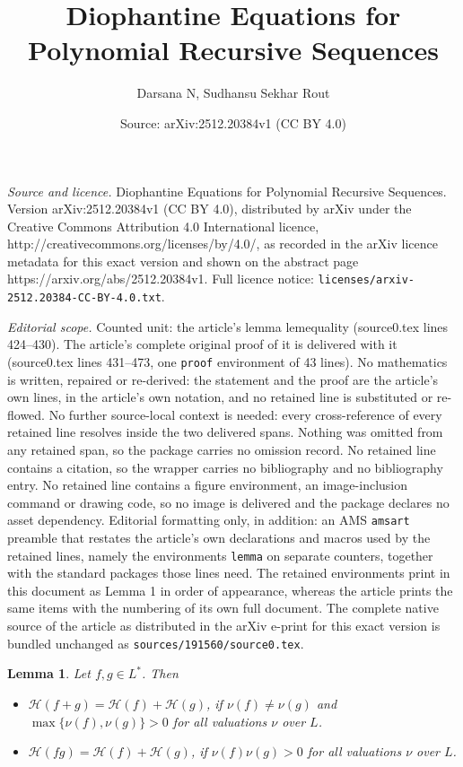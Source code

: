 \documentclass[10pt,a4paper]{amsart}
\title{Diophantine Equations for Polynomial Recursive Sequences}
\author{Darsana N, Sudhansu Sekhar Rout}
\date{Source: arXiv:2512.20384v1 (CC BY 4.0)}
\newtheorem{lemma}{Lemma}
\begin{document}
\maketitle

\noindent\emph{Source and licence.} Diophantine Equations for Polynomial Recursive Sequences. Version arXiv:2512.20384v1 (CC BY 4.0), distributed by arXiv under the Creative Commons Attribution 4.0 International licence, http://creativecommons.org/licenses/by/4.0/, as recorded in the arXiv licence metadata for this exact version and shown on the abstract page https://arxiv.org/abs/2512.20384v1. Full licence notice: \texttt{licenses/arxiv-2512.20384-CC-BY-4.0.txt}.\par\smallskip

\noindent\textit{Editorial scope.} Counted unit: the article's lemma lemequality (source0.tex lines 424--430). The article's complete original proof of it is delivered with it (source0.tex lines 431--473, one \texttt{proof} environment of 43 lines). No mathematics is written, repaired or re-derived: the statement and the proof are the article's own lines, in the article's own notation, and no retained line is substituted or re-flowed.  No further source-local context is needed: every cross-reference of every retained line resolves inside the two delivered spans.  Nothing was omitted from any retained span, so the package carries no omission record.  No retained line contains a citation, so the wrapper carries no bibliography and no bibliography entry.  No retained line contains a figure environment, an image-inclusion command or drawing code, so no image is delivered and the package declares no asset dependency.  Editorial formatting only, in addition: an AMS \texttt{amsart} preamble that restates the article's own declarations and macros used by the retained lines, namely the environments \texttt{lemma} on separate counters, together with the standard packages those lines need.  The retained environments print in this document as Lemma 1 in order of appearance, whereas the article prints the same items with the numbering of its own full document.  The complete native source of the article as distributed in the arXiv e-print for this exact version is bundled unchanged as \texttt{sources/191560/source0.tex}.
    \begin{lemma}\label{lemequality}
    Let $f,g\in L^{*}$. Then
        \begin{itemize}
            \item[(i)] $\mathcal{H}(f+g)=\mathcal{H}(f)+\mathcal{H}(g)$, if $\nu(f)\neq \nu (g)$ and $\max \{\nu(f),\nu (g)\}>0$ for all valuations $\nu$ over $L$.
            \item[(ii)] $\mathcal{H}(fg)=\mathcal{H}(f)+\mathcal{H}(g)$, if $\nu(f)\nu (g)>0$ for all valuations $\nu$ over $L$. 
        \end{itemize}
    \end{lemma}
\end{document}
